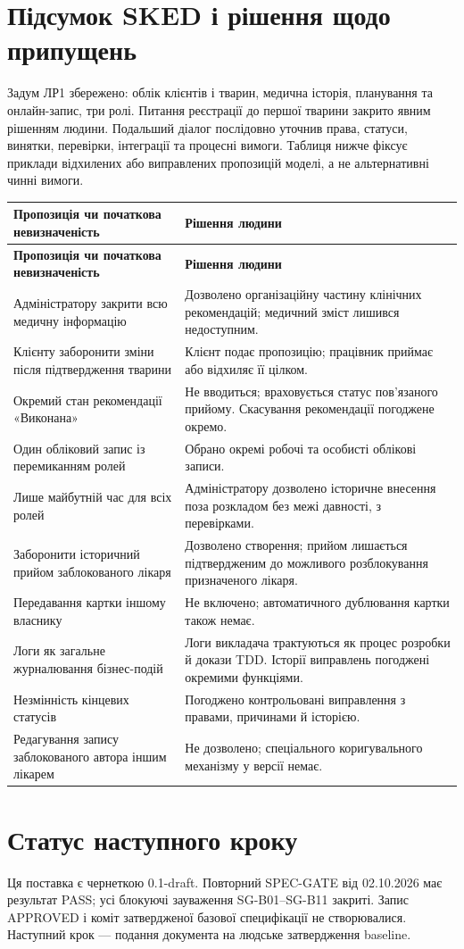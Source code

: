\documentclass[11pt,a4paper]{article}
\begin{document}
\section{Підсумок SKED і рішення щодо припущень}
Задум ЛР1 збережено: облік клієнтів і тварин, медична історія, планування та онлайн-запис, три ролі. Питання реєстрації до першої тварини закрито явним рішенням людини. Подальший діалог послідовно уточнив права, статуси, винятки, перевірки, інтеграції та процесні вимоги. Таблиця нижче фіксує приклади відхилених або виправлених пропозицій моделі, а не альтернативні чинні вимоги.

\begin{longtable}{>{\raggedright\arraybackslash}p{7.6cm} >{\raggedright\arraybackslash}p{7.6cm}}
\toprule
\textbf{Пропозиція чи початкова невизначеність} & \textbf{Рішення людини} \\ \midrule
\endfirsthead
\toprule
\textbf{Пропозиція чи початкова невизначеність} & \textbf{Рішення людини} \\ \midrule
\endhead
\bottomrule
\endfoot
Адміністратору закрити всю медичну інформацію & Дозволено організаційну частину клінічних рекомендацій; медичний зміст лишився недоступним. \\
Клієнту заборонити зміни після підтвердження тварини & Клієнт подає пропозицію; працівник приймає або відхиляє її цілком. \\
Окремий стан рекомендації «Виконана» & Не вводиться; враховується статус пов’язаного прийому. Скасування рекомендації погоджене окремо. \\
Один обліковий запис із перемиканням ролей & Обрано окремі робочі та особисті облікові записи. \\
Лише майбутній час для всіх ролей & Адміністратору дозволено історичне внесення поза розкладом без межі давності, з перевірками. \\
Заборонити історичний прийом заблокованого лікаря & Дозволено створення; прийом лишається підтвердженим до можливого розблокування призначеного лікаря. \\
Передавання картки іншому власнику & Не включено; автоматичного дублювання картки також немає. \\
Логи як загальне журналювання бізнес-подій & Логи викладача трактуються як процес розробки й докази TDD. Історії виправлень погоджені окремими функціями. \\
Незмінність кінцевих статусів & Погоджено контрольовані виправлення з правами, причинами й історією. \\
Редагування запису заблокованого автора іншим лікарем & Не дозволено; спеціального коригувального механізму у версії немає. \\
\end{longtable}

\section{Статус наступного кроку}
Ця поставка є чернеткою 0.1-draft. Повторний SPEC-GATE від 02.10.2026 має результат PASS; усі блокуючі зауваження SG-B01–SG-B11 закриті. Запис APPROVED і коміт затвердженої базової специфікації не створювалися. Наступний крок — подання документа на людське затвердження baseline.
\end{document}
